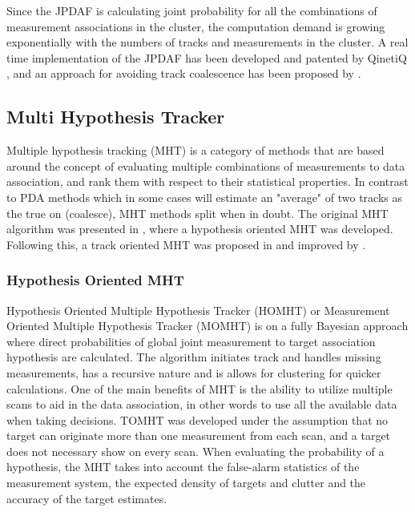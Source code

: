 Since the JPDAF is calculating joint probability for all the combinations of measurement associations in the cluster, the computation demand is growing exponentially with the numbers of tracks and measurements in the cluster. A real time implementation of the JPDAF has been developed and patented by QinetiQ \cite{QinetiQ2003}, and an approach for avoiding track coalescence has been proposed by \cite{Blom2000}.                                                   

\subsection{Multi Hypothesis Tracker}
Multiple hypothesis tracking (MHT) is a category of methods that are based around the concept of evaluating multiple  combinations of measurements to data association, and rank them with respect to their statistical properties. In contrast to PDA methods which in some cases will estimate an "average" of two tracks as the true on (coalesce), MHT methods split when in doubt. The original MHT algorithm was presented in \cite{Reid1978}, where a hypothesis oriented MHT was developed. Following this, a track oriented MHT was proposed in \cite{Kurien1990} and improved by \cite{Bar-Shalom2007}.

\subsubsection{Hypothesis Oriented MHT}
Hypothesis Oriented Multiple Hypothesis Tracker (HOMHT) or Measurement Oriented Multiple Hypothesis Tracker (MOMHT) is on a fully Bayesian approach where direct probabilities of global joint measurement to target association hypothesis are calculated. The algorithm initiates track and handles missing measurements, has a recursive nature and is allows for clustering for quicker calculations. One of the main benefits of MHT is the ability to utilize multiple scans to aid in the data association, in other words to use all the available data when taking decisions. TOMHT was developed under the assumption that no target can originate more than one measurement from each scan, and a target does not necessary show on every scan. When evaluating the probability of a hypothesis, the MHT takes into account the false-alarm statistics of the measurement system, the expected density of targets and clutter and the accuracy of the target estimates.

